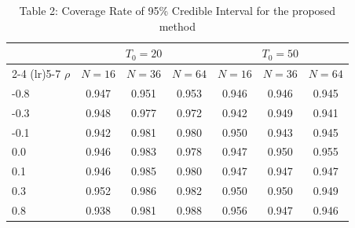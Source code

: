 \begin{table}[!htbp]
\centering
\caption{Table 2: Coverage Rate of 95\% Credible Interval for the proposed method}
\begin{tabular}{lccc ccc}
\toprule
 & \multicolumn{3}{c}{$T_0 = 20$} & \multicolumn{3}{c}{$T_0 = 50$}\\
\cmidrule(lr){2-4} \cmidrule(lr){5-7}
$\rho$ & $N = 16$ & $N = 36$ & $N = 64$ & $N = 16$ & $N = 36$ & $N = 64$ \\
\midrule
-0.8 & 0.947 & 0.951 & 0.953 & 0.946 & 0.946 & 0.945 \\
-0.3 & 0.948 & 0.977 & 0.972 & 0.942 & 0.949 & 0.941 \\
-0.1 & 0.942 & 0.981 & 0.980 & 0.950 & 0.943 & 0.945 \\
 0.0 & 0.946 & 0.983 & 0.978 & 0.947 & 0.950 & 0.955 \\
 0.1 & 0.946 & 0.985 & 0.980 & 0.947 & 0.947 & 0.947 \\
 0.3 & 0.952 & 0.986 & 0.982 & 0.950 & 0.950 & 0.949 \\
 0.8 & 0.938 & 0.981 & 0.988 & 0.956 & 0.947 & 0.946 \\
\bottomrule
\end{tabular}
\end{table}

